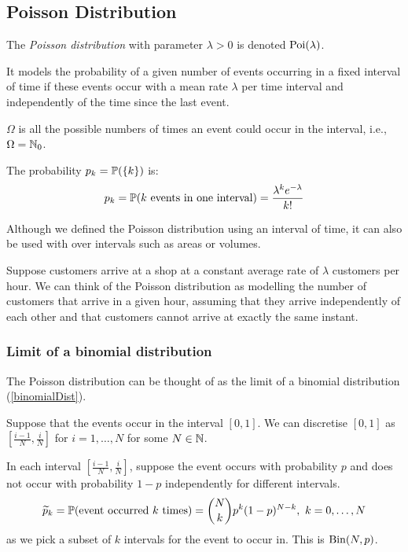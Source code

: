 \documentclass[../main.tex]{subfiles}
\begin{document}
\subsection{Poisson Distribution}
\begin{definition}
  The \textit{Poisson distribution} with parameter $\lambda > 0$ is denoted $\poisson(\lambda)$.

  It models the probability of a given number of events occurring in a fixed interval of time if these events occur with a mean rate $\lambda$ per time interval and independently of the time since the last event.

  $\Omega$ is all the possible numbers of times an event could occur in the interval, i.e., $\Omega = \N_0$.

  The probability $p_k = \P(\{k\})$ is:
  \[
    p_k = \P(\text{$k$ events in one interval}) = \frac{\lambda^{k} e^{-\lambda}}{k!}
  \]
\end{definition}
\begin{remark}
  Although we defined the Poisson distribution using an interval of time, it can also be used with over intervals such as areas or volumes.
\end{remark}
\begin{remark}[Intuition]
  Suppose customers arrive at a shop at a constant average rate of $\lambda$ customers per hour.
  We can think of the Poisson distribution as modelling the number of customers that arrive in a given hour, assuming that they arrive independently of each other and that customers cannot arrive at exactly the same instant.
\end{remark}
\subsubsection{Limit of a binomial distribution} \label{binomialLimitPoisson}
The Poisson distribution can be thought of as the limit of a binomial distribution (\cref{binomialDist}).

Suppose that the events occur in the interval $[0, 1]$.
We can discretise $[0, 1]$ as $[\frac{i - 1}{N}, \frac{i}{N}]$ for $i = 1, \ldots, N$ for some $N \in \N$.

In each interval $[\frac{i - 1}{N}, \frac{i}{N}]$, suppose the event occurs with probability $p$ and does not occur with probability $1 - p$ independently for different intervals.
\[
  \widetilde{p}_k = \P(\text{event occurred $k$ times}) = \binom{N}{k} p^{k} (1 - p)^{N - k},\ k = 0, \ldots, N
\]
as we pick a subset of $k$ intervals for the event to occur in.
This is $\binomial(N, p)$.
\end{document}
